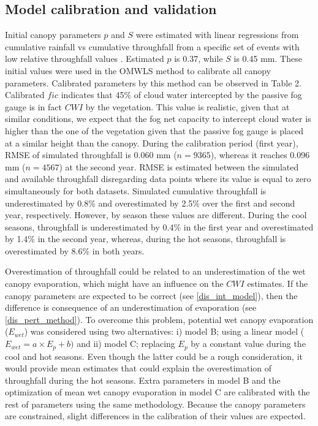 \documentclass[a4paper,12pt]{article}
\begin{document}
\subsection{Model calibration and validation}
Initial canopy parameters $p$ and $S$ were estimated with linear regressions from cumulative rainfall vs cumulative throughfall from a specific set of events with low relative throughfall values \citep{Pryetetal2012a}. Estimated $p$ is 0.37, while $S$ is 0.45 mm. These initial values were used in the OMWLS method to calibrate all canopy parameters. Calibrated parameters by this method can be observed in Table 2. Calibrated $fic$ indicates that 45\% of cloud water intercepted by the passive fog gauge is in fact $CWI$ by the vegetation. This value is realistic, given that at similar conditions, we expect that the fog net capacity to intercept cloud water is higher than the one of the vegetation given that the passive fog gauge is placed at a similar height than the canopy. During the calibration period (first year), RMSE of simulated throughfall is 0.060 mm ($n=9365$), whereas it reaches 0.096 mm ($n=4567$) at the second year. RMSE is estimated between the simulated and available throughfall disregarding data points where its value is equal to zero simultaneously for both datasets. Simulated cumulative throughfall is underestimated by 0.8\% and overestimated by 2.5\% over the first and second year, respectively. However, by season these values are different. During the cool seasons, throughfall is underestimated by 0.4\% in the first year and overestimated by 1.4\% in the second year, whereas, during the hot seasons, throughfall is overestimated by 8.6\% in both years.

Overestimation of throughfall could be related to an underestimation of the wet canopy evaporation, which might have an influence on the $CWI$ estimates. If the canopy parameters are expected to be correct (see \autoref{dis_int_model}), then the difference is consequence of an underestimation of evaporation (see \autoref{dis_pert_method}). To overcome this problem, potential wet canopy evaporation ($E_{wet}$) was considered using two alternatives: i) model B; using a linear model ($E_{wet} = a \times E_p + b)$ and ii) model C; replacing $E_p$ by a constant value during the cool and hot seasons. Even though the latter could be a rough consideration, it would provide mean estimates that could explain the overestimation of throughfall during the hot seasons. Extra parameters in model B and the optimization of mean wet canopy evaporation in model C are calibrated with the rest of parameters using the same methodology. Because the canopy parameters are constrained, slight differences in the calibration of their values are expected.  
\end{document}
